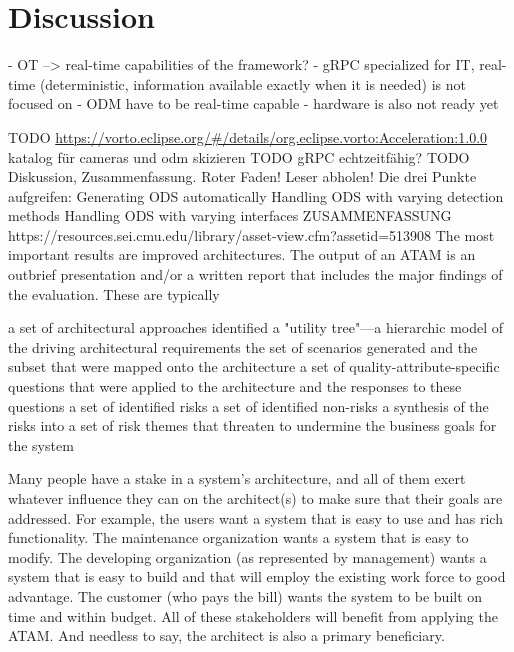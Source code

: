 \section{Discussion}
- OT --> real-time capabilities of the framework?
    - gRPC specialized for IT, real-time (deterministic, information available exactly when it is needed) is not focused on
    - ODM have to be real-time capable
    - hardware is also not ready yet

TODO    \url{https://vorto.eclipse.org/#/details/org.eclipse.vorto:Acceleration:1.0.0}
    katalog für cameras und odm skizieren
TODO gRPC echtzeitfähig?
TODO Diskussion, Zusammenfassung. Roter Faden! Leser abholen! Die drei Punkte aufgreifen:     Generating ODS automatically
    Handling ODS with varying detection methods
    Handling ODS with varying interfaces
ZUSAMMENFASSUNG https://resources.sei.cmu.edu/library/asset-view.cfm?assetid=513908
The most important results are improved architectures. The output of an ATAM is an outbrief presentation and/or a written report that includes the major findings of the evaluation. These are typically

a set of architectural approaches identified
a "utility tree"—a hierarchic model of the driving architectural requirements
the set of scenarios generated and the subset that were mapped onto the architecture
a set of quality-attribute-specific questions that were applied to the architecture and the responses to these questions
a set of identified risks
a set of identified non-risks
a synthesis of the risks into a set of risk themes that threaten to undermine the business goals for the system

Many people have a stake in a system's architecture, and all of them exert whatever influence they can on the architect(s) to make sure that their goals are addressed. For example, the users want a system that is easy to use and has rich functionality. The maintenance organization wants a system that is easy to modify. The developing organization (as represented by management) wants a system that is easy to build and that will employ the existing work force to good advantage. The customer (who pays the bill) wants the system to be built on time and within budget. All of these stakeholders will benefit from applying the ATAM. And needless to say, the architect is also a primary beneficiary.

